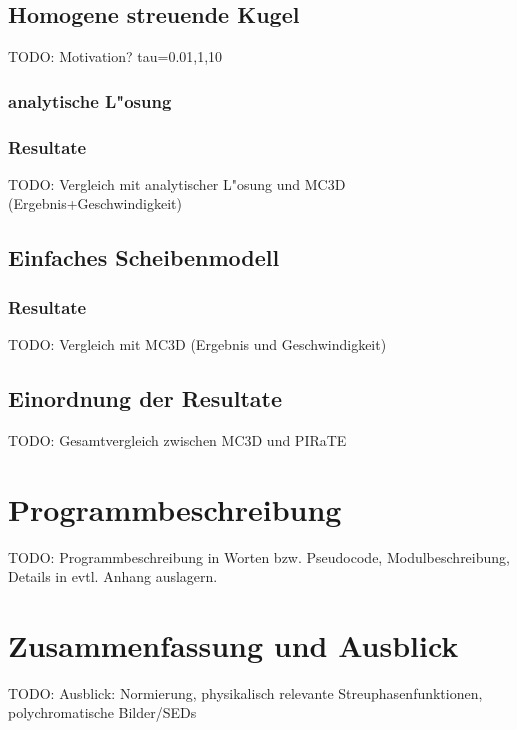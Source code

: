 \documentclass[11pt,a4paper,DIVcalc,BCOR8mm,titlepage,twoside]{scrartcl}
\begin{document}
	\subsection{Homogene streuende Kugel}
	TODO: Motivation? tau=0.01,1,10
	\subsubsection{analytische L"osung}
	\subsubsection{Resultate}
	TODO: Vergleich mit analytischer L"osung und MC3D (Ergebnis+Geschwindigkeit)
	\subsection{Einfaches Scheibenmodell}
	\subsubsection{Resultate}
	TODO: Vergleich mit MC3D (Ergebnis und Geschwindigkeit)
	\subsection{Einordnung der Resultate}
	TODO: Gesamtvergleich zwischen MC3D und PIRaTE
	
	\section{Programmbeschreibung}
	TODO: Programmbeschreibung in Worten bzw. Pseudocode, Modulbeschreibung, Details in evtl. Anhang auslagern.
	
	\section{Zusammenfassung und Ausblick}
	TODO: Ausblick: Normierung, physikalisch relevante Streuphasenfunktionen, polychromatische Bilder/SEDs

	
	
\end{document}
